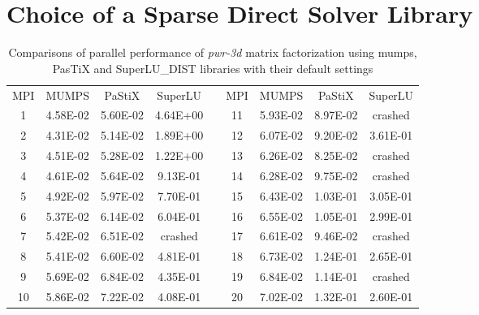 \chapter{Choice of a Sparse Direct Solver Library}
\label{app:app-lc}

\begin{table}[ht]
\centering
\begin{tabular}{|c|c|c|c|l|c|c|c|c|}
\cline{1-4} \cline{6-9}
MPI & MUMPS    & PaStiX   & SuperLU  &  & MPI & MUMPS    & PaStiX   & SuperLU  \\ \cline{1-4} \cline{6-9} 
1   & 4.58E-02 & 5.60E-02 & 4.64E+00 &  & 11  & 5.93E-02 & 8.97E-02 & crashed  \\ \cline{1-4} \cline{6-9} 
2   & 4.31E-02 & 5.14E-02 & 1.89E+00 &  & 12  & 6.07E-02 & 9.20E-02 & 3.61E-01 \\ \cline{1-4} \cline{6-9} 
3   & 4.51E-02 & 5.28E-02 & 1.22E+00 &  & 13  & 6.26E-02 & 8.25E-02 & crashed  \\ \cline{1-4} \cline{6-9} 
4   & 4.61E-02 & 5.64E-02 & 9.13E-01 &  & 14  & 6.28E-02 & 9.75E-02 & crashed  \\ \cline{1-4} \cline{6-9} 
5   & 4.92E-02 & 5.97E-02 & 7.70E-01 &  & 15  & 6.43E-02 & 1.03E-01 & 3.05E-01 \\ \cline{1-4} \cline{6-9} 
6   & 5.37E-02 & 6.14E-02 & 6.04E-01 &  & 16  & 6.55E-02 & 1.05E-01 & 2.99E-01 \\ \cline{1-4} \cline{6-9} 
7   & 5.42E-02 & 6.51E-02 & crashed  &  & 17  & 6.61E-02 & 9.46E-02 & crashed  \\ \cline{1-4} \cline{6-9} 
8   & 5.41E-02 & 6.60E-02 & 4.81E-01 &  & 18  & 6.73E-02 & 1.24E-01 & 2.65E-01 \\ \cline{1-4} \cline{6-9} 
9   & 5.69E-02 & 6.84E-02 & 4.35E-01 &  & 19  & 6.84E-02 & 1.14E-01 & crashed  \\ \cline{1-4} \cline{6-9} 
10  & 5.86E-02 & 7.22E-02 & 4.08E-01 &  & 20  & 7.02E-02 & 1.32E-01 & 2.60E-01 \\ \cline{1-4} \cline{6-9} 
\end{tabular}
\caption{Comparisons of parallel performance of  \textit{pwr-3d} matrix factorization using \gls{mumps}, PasTiX and SuperLU\_DIST libraries with their default settings}
\label{table:app-lc-pwr-3d-result}
\end{table}

